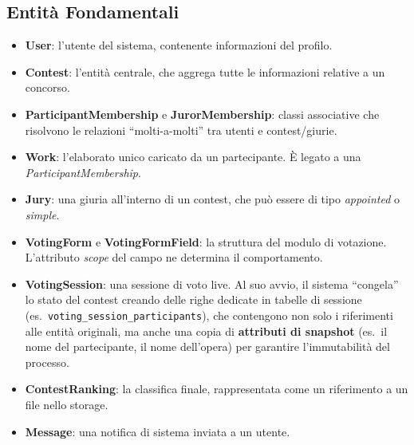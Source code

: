 \subsection{Entità Fondamentali}\label{subsec:entita-fondamentali}
\begin{itemize}
    \item \textbf{User}: l'utente del sistema, contenente informazioni del profilo.
    \item \textbf{Contest}: l'entità centrale, che aggrega tutte le informazioni relative a un concorso.
    \item \textbf{ParticipantMembership} e \textbf{JurorMembership}: classi associative che risolvono le relazioni ``molti-a-molti'' tra utenti e contest/giurie.
    \item \textbf{Work}: l'elaborato unico caricato da un partecipante.
    È legato a una \emph{ParticipantMembership}.
    \item \textbf{Jury}: una giuria all'interno di un contest, che può essere di tipo \emph{appointed} o \emph{simple}.
    \item \textbf{VotingForm} e \textbf{VotingFormField}: la struttura del modulo di votazione.
    L'attributo \emph{scope} del campo ne determina il comportamento.
    \item \textbf{VotingSession}: una sessione di voto live.
    Al suo avvio, il sistema ``congela'' lo stato del contest creando delle righe dedicate in tabelle di sessione (es.\ \texttt{voting\_session\_participants}), che contengono non solo i riferimenti alle entità originali, ma anche una copia di \textbf{attributi di snapshot} (es.\ il nome del partecipante, il nome dell'opera) per garantire l'immutabilità del processo.
    \item \textbf{ContestRanking}: la classifica finale, rappresentata come un riferimento a un file nello storage.
    \item \textbf{Message}: una notifica di sistema inviata a un utente.
\end{itemize}

